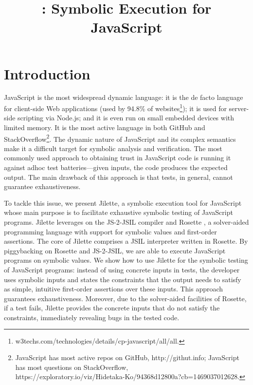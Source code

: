 \documentclass{llncs}
\title{\jilette: Symbolic Execution for JavaScript}
\author{}
\institute{Imperial College London}
\newcommand{\JSComp}{JS-2-JSIL\xspace}
\begin{document}
%

\maketitle 

\begin{abstract}

\end{abstract}


\section{Introduction}

JavaScript is the most widespread
dynamic language: it is the de facto language for client-side Web
applications (used by 94.8\% of
websites\footnote{w3techs.com/technologies/details/cp-javascript/all/all.});
it is used for server-side scripting via Node.js; and it is even run on
small embedded devices with limited memory. It is the most active
language in both GitHub and StackOverflow\footnote{JavaScript  has most active
  repos on GitHub, http://githut.info; JavaScript has most questions on
  StackOverflow, \\https://exploratory.io/viz/Hidetaka-Ko/94368d12800a?cb=1469037012628.}.
The dynamic nature of
JavaScript and its complex semantics make it a difficult target for
symbolic analysis and verification. 
% 
The most commonly used 
approach to obtaining trust in JavaScript code is running it against 
adhoc test batteries---given inputs, the code produces the expected
output. The main drawback of this approach is that tests, in general,
cannot guarantee exhaustiveness.

To tackle this issue, we present Jilette, a symbolic execution tool for 
JavaScript whose main purpose is to facilitate exhaustive symbolic 
testing of JavaScript programs. Jilette leverages on the
\JSComp compiler and Rosette \cite{Rosette1}, a solver-aided programming
language with support for symbolic values and first-order
assertions. The core of Jilette comprises a JSIL interpreter
written in Rosette. By piggybacking on Rosette and JS-2-JSIL, we 
are able to execute JavaScript programs on symbolic values. 
We show how to use Jilette
for the symbolic testing of JavaScript programs: instead of using concrete 
inputs in tests, the developer uses symbolic inputs and states the 
constraints that the output needs to satisfy as simple, intuitive 
first-order assertions over these inputs. 
This approach guarantees exhaustiveness. Moreover, due to the
solver-aided facilities of Rosette, if a test fails, 
Jilette provides the concrete inputs that do not satisfy the
constraints, immediately revealing bugs in the tested code.
\end{document}
